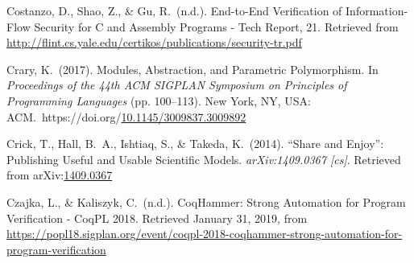 \documentclass[12pt,twoside]{article}
\begin{document}
{\begin{thebibliography}{222}
\mdbibitemlabel{}Costanzo, D., Shao, Z., \& Gu, R.~(n.d.). End-to-End Veriﬁcation of Information-Flow Security for C and Assembly Programs - Tech Report, 21. Retrieved from \href{http://flint.cs.yale.edu/certikos/publications/security-tr.pdf}{{\ttfamily http://\hspace{0pt}flint.\hspace{0pt}cs.\hspace{0pt}yale.\hspace{0pt}edu/\hspace{0pt}certikos/\hspace{0pt}publications/\hspace{0pt}security-\hspace{0pt}tr.\hspace{0pt}pdf}}\label{costanzo_end--end_nodate}%

\mdbibitemlabel{}Crary, K.~(2017). Modules, Abstraction, and Parametric Polymorphism. In \emph{Proceedings of the 44th ACM SIGPLAN Symposium on Principles of Programming Languages} (pp. 100–113). New York, NY, USA: ACM.~https://doi.org/\href{https://dx.doi.org/10.1145/3009837.3009892}{10.1145/3009837.3009892}\label{crary_modules_2017}%

\mdbibitemlabel{}Crick, T., Hall, B.~A., Ishtiaq, S., \& Takeda, K.~(2014). \textquotedblleft{}Share and Enjoy\textquotedblright{}: Publishing Useful and Usable Scientific Models. \emph{arXiv:1409.0367 {}[cs]}. Retrieved from arXiv:\href{http://arxiv.org/abs/1409.0367}{1409.0367}\label{crick_share_2014}%

\mdbibitemlabel{}Czajka, L., \& Kaliszyk, C.~(n.d.). CoqHammer: Strong Automation for Program Verification - CoqPL 2018. Retrieved January 31, 2019, from \href{https://popl18.sigplan.org/event/coqpl-2018-coqhammer-strong-automation-for-program-verification}{{\ttfamily https://\hspace{0pt}popl18.\hspace{0pt}sigplan.\hspace{0pt}org/\hspace{0pt}event/\hspace{0pt}coqpl-\hspace{0pt}2018-\hspace{0pt}coqhammer-\hspace{0pt}strong-\hspace{0pt}automation-\hspace{0pt}for-\hspace{0pt}program-\hspace{0pt}verification}}\label{czajka_coqhammer:_nodate}%


\end{thebibliography}}
\end{document}
